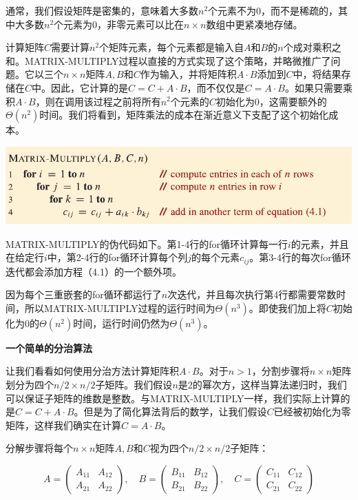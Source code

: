 \documentclass[lang=cn,newtx,10pt,scheme=chinese]{elegantbook}
\begin{document}
通常，我们假设矩阵是密集的，意味着大多数$n^2$个元素不为0，而不是稀疏的，其中大多数$n^2$个元素为0，非零元素可以比在$n \times n$数组中更紧凑地存储。

计算矩阵$C$需要计算$n^2$个矩阵元素，每个元素都是输入自$A$和$B$的$n$个成对乘积之和。MATRIX-MULTIPLY过程以直接的方式实现了这个策略，并略微推广了问题。它以三个$n \times n$矩阵$A, B$和$C$作为输入，并将矩阵积$A \cdot B$添加到$C$中，将结果存储在$C$中。因此，它计算的是$C=C+A \cdot B$，而不仅仅是$C=A \cdot B$。如果只需要乘积$A \cdot B$，则在调用该过程之前将所有$n^2$个元素的$C$初始化为0，这需要额外的$\Theta\left(n^2\right)$时间。我们将看到，矩阵乘法的成本在渐近意义下支配了这个初始化成本。

\includegraphics{算法导论第四版插图/第四章/普通矩阵相乘算法.pdf}

MATRIX-MULTIPLY的伪代码如下。第1-4行的for循环计算每一行$i$的元素，并且在给定行$i$中，第2-4行的for循环计算每个列$j$的每个元素$c_{i j}$。第3-4行的每次for循环迭代都会添加方程（4.1）的一个额外项。

因为每个三重嵌套的for循环都运行了$n$次迭代，并且每次执行第4行都需要常数时间，所以MATRIX-MULTIPLY过程的运行时间为$\Theta\left(n^3\right)$。即使我们加上将$C$初始化为0的$\Theta\left(n^2\right)$时间，运行时间仍然为$\Theta\left(n^3\right)$。

\textbf{一个简单的分治算法}

让我们看看如何使用分治方法计算矩阵积$A \cdot B$。对于$n>1$，分割步骤将$n \times n$矩阵划分为四个$n / 2 \times n / 2$子矩阵。我们假设$n$是2的幂次方，这样当算法递归时，我们可以保证子矩阵的维数是整数。与MATRIX-MULTIPLY一样，我们实际上计算的是$C=C+A \cdot B$。但是为了简化算法背后的数学，让我们假设$C$已经被初始化为零矩阵，这样我们确实在计算$C=A \cdot B$。

分解步骤将每个$n \times n$矩阵$A, B$和$C$视为四个$n / 2 \times n / 2$子矩阵：

\begin{equation}
A=\left(\begin{array}{ll}
A_{11} & A_{12} \\
A_{21} & A_{22}
\end{array}\right), \quad B=\left(\begin{array}{ll}
B_{11} & B_{12} \\
B_{21} & B_{22}
\end{array}\right), \quad C=\left(\begin{array}{ll}
C_{11} & C_{12} \\
C_{21} & C_{22}
\end{array}\right)
\end{equation}
\end{document}

